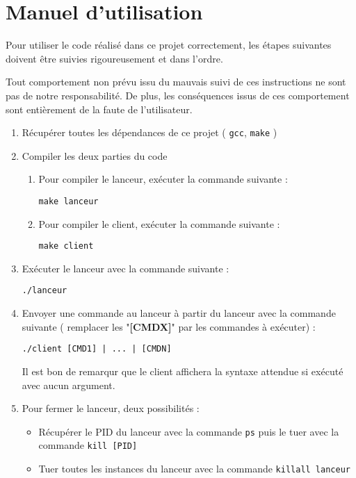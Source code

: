 \documentclass[12pt]{article}
\begin{document}
\section{Manuel d'utilisation}

Pour utiliser le code réalisé dans ce projet correctement, les étapes
suivantes doivent être suivies rigoureusement et dans l'ordre.

Tout comportement non prévu issu du mauvais suivi de ces instructions ne
sont pas de notre responsabilité. De plus, les conséquences issus de ces
comportement sont entièrement de la faute de l'utilisateur.

\begin{enumerate}
    \item Récupérer toutes les dépendances de ce projet ( \texttt{gcc},
          \texttt{make} )
    \item Compiler les deux parties du code
          \begin{enumerate}
              \item Pour compiler le lanceur, exécuter la commande suivante :
                    \begin{center}

                        \texttt{make lanceur}
                    \end{center}
              \item Pour compiler le client, exécuter la commande suivante :
                    \begin{center}

                        \texttt{make client}
                    \end{center}
          \end{enumerate}
    \item Exécuter le lanceur avec la commande suivante : \begin{center}

              \texttt{./lanceur}
          \end{center}
    \item Envoyer une commande au lanceur à partir du lanceur avec la
          commande suivante ( remplacer les "\textbf{[CMDX]}" par les commandes à
          exécuter) : \begin{center}

              \texttt{./client [CMD1] | ... | [CMDN]}
          \end{center}
          Il est bon de remarqur que le client affichera la syntaxe attendue si
          exécuté avec aucun argument.
    \item Pour fermer le lanceur, deux possibilités :
          \begin{itemize}
              \item Récupérer le PID du lanceur avec la commande \texttt{ps} puis
                    le tuer avec la commande \texttt{kill [PID]}
              \item Tuer toutes les instances du lanceur avec la commande
                    \texttt{killall lanceur}
          \end{itemize}
\end{enumerate}
\end{document}
